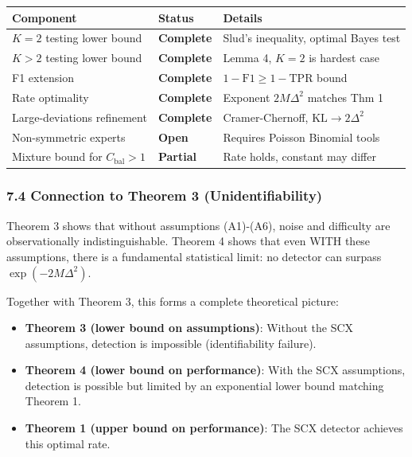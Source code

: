 \documentclass[
  12pt,
]{article}
\providecommand{\tightlist}{%
  \setlength{\itemsep}{0pt}\setlength{\parskip}{0pt}}
\begin{document}
\begin{longtable}[]{@{}
  >{\raggedright\arraybackslash}p{}
  >{\raggedright\arraybackslash}p{}
  >{\raggedright\arraybackslash}p{}@{}}
\toprule\noalign{}
\begin{minipage}[b]{\linewidth}\raggedright
Component
\end{minipage} & \begin{minipage}[b]{\linewidth}\raggedright
Status
\end{minipage} & \begin{minipage}[b]{\linewidth}\raggedright
Details
\end{minipage} \\
\midrule\noalign{}
\endhead
\bottomrule\noalign{}
\endlastfoot
\(K=2\) testing lower bound & \textbf{Complete} & Slud's inequality,
optimal Bayes test \\
\(K>2\) testing lower bound & \textbf{Complete} & Lemma 4, \(K=2\) is
hardest case \\
F1 extension & \textbf{Complete} & \(1-\text{F1} \geq 1-\text{TPR}\)
bound \\
Rate optimality & \textbf{Complete} & Exponent \(2M\Delta^2\) matches
Thm 1 \\
Large-deviations refinement & \textbf{Complete} & Cramer-Chernoff,
\(\text{KL} \to 2\Delta^2\) \\
Non-symmetric experts & \textbf{Open} & Requires Poisson Binomial
tools \\
Mixture bound for \(C_{\text{bal}}>1\) & \textbf{Partial} & Rate holds,
constant may differ \\
\end{longtable}

\subsubsection{7.4 Connection to Theorem 3
(Unidentifiability)}\label{connection-to-theorem-3-unidentifiability}

Theorem 3 shows that without assumptions (A1)-(A6), noise and difficulty
are observationally indistinguishable. Theorem 4 shows that even WITH
these assumptions, there is a fundamental statistical limit: no detector
can surpass \(\exp(-2M\Delta^2)\).

Together with Theorem 3, this forms a complete theoretical picture:

\begin{itemize}
\tightlist
\item
  \textbf{Theorem 3 (lower bound on assumptions)}: Without the SCX
  assumptions, detection is impossible (identifiability failure).
\item
  \textbf{Theorem 4 (lower bound on performance)}: With the SCX
  assumptions, detection is possible but limited by an exponential lower
  bound matching Theorem 1.
\item
  \textbf{Theorem 1 (upper bound on performance)}: The SCX detector
  achieves this optimal rate.
\end{itemize}
\end{document}
